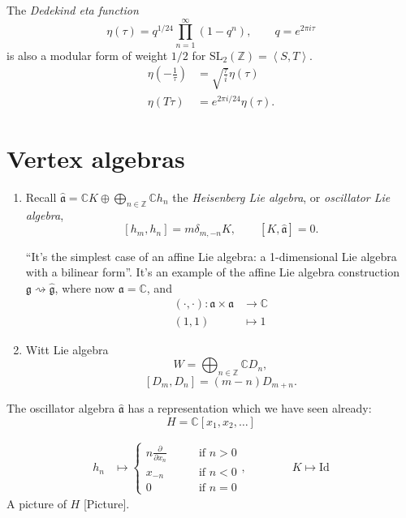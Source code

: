 \begin{theorem}
\label{theorem-dedekind-eta-function}
The {\it Dedekind eta function} 
$$
\eta(\tau)=q^{1/24}\prod_{n=1}^\infty (1-q^n),\qquad q=e^{2\pi i \tau}
$$
is also a modular form of weight $1/2$ for
$\text{SL}_2(\mathbb{Z})=\left<S,T\right>$.
\begin{align*}
\eta\left(-\frac{1}{\tau}\right)&=\sqrt{\frac{\tau}{i}}\eta(\tau)\\
\eta(T\tau)&=e^{2\pi i/24}\eta(\tau).
\end{align*}

\end{theorem}

\section{Vertex algebras}
\label{section-vertex-algebras}

\begin{enumerate}
\item Recall $\hat{\mathfrak{a}}=\mathbb{C}K\oplus 
\bigoplus_{n \in \mathbb{Z}}\mathbb{C}h_n$ the {\it Heisenberg Lie algebra},
or {\it oscillator Lie algebra},
$$
[h_m,h_n]=m\delta_{m,-n}K,\qquad [K,\hat{\mathfrak{a}}]=0.
$$
\begin{remark}
\label{remark-Heisenberg-is-affine}
``It's the simplest case of an affine Lie algebra: a 1-dimensional
Lie algebra with a bilinear form''. It's an example of the affine
Lie algebra construction
$\mathfrak{g} \rightsquigarrow \hat{\mathfrak{g}}$,
where now $\mathfrak{a}=\mathbb{C}$,
and
 \begin{align*}
(\cdot,\cdot): \mathfrak{a}\times\mathfrak{a} &\longrightarrow \mathbb{C} \\
(1,1) &\longmapsto 1
\end{align*}
\end{remark}

\item Witt Lie algebra
$$
W=\bigoplus_{n \in \mathbb{Z}}\mathbb{C}D_n,
$$
$$
[D_m,D_n]=(m-n)D_{m+n}.
$$
\end{enumerate}

\medskip\noindent
The oscillator algebra $\hat{\mathfrak{a}}$ 
has a representation which we have seen already:
$$
H=\mathbb{C}[x_1,x_2,\ldots]
$$

\begin{align*}
h_n&\mapsto \begin{cases}
n \frac{\partial }{\partial x_n}\qquad &\text{if }n>0\\
x_{-n}\qquad &\text{if }n<0\\
0\qquad &\text{if }n=0
\end{cases},
\qquad \qquad  K\mapsto \text{Id}
\end{align*}
A picture of $H$ [Picture].

